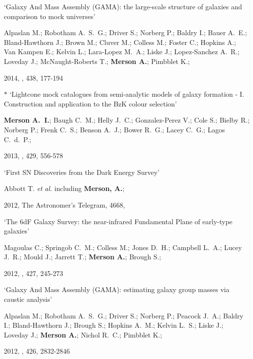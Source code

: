 \begin{etaremune}[leftmargin=15pt]
\item \label{itm:Alpaslan2014} `Galaxy And Mass Assembly (GAMA): the large-scale structure of galaxies and comparison to mock universes'\newline
  \begin{small}Alpaslan M.; Robotham A.~S.~G.; Driver S.; Norberg P.; Baldry I.; Bauer A.~E.; Bland-Hawthorn J.; Brown M.; Cluver M.; Colless M.; Foster C.; Hopkins A.; Van Kampen E.; Kelvin L.; Lara-Lopez M.~A.; Liske J.; Lopez-Sanchez A.~R.; Loveday J.; McNaught-Roberts T.; \textbf{Merson A.}; Pimbblet K.;\end{small} 2014, \mnras, 438, 177-194

\item \label{itm:Merson2013}{\Large $\ast$} `Lightcone mock catalogues from semi-analytic models of galaxy formation - I. Construction and application to the BzK colour selection'\newline
  \begin{small}\textbf{Merson A.~I.}; Baugh C.~M.; Helly J.~C.; Gonzalez-Perez V.; Cole S.; Bielby R.; Norberg P.; Frenk C.~S.; Benson A.~J.; Bower R.~G.; Lacey C.~G.; Lagos C.~d.~P.;\end{small} 2013, \mnras, 429, 556-578

\item \label{itm:Abbott2012} `First SN Discoveries from the Dark Energy Survey'\newline
  \begin{small}Abbott T. \textit{et al.} including \textbf{Merson, A.};\end{small} 2012, The Astronomer's Telegram, 4668,

\item \label{itm:Magoulas2012} `The 6dF Galaxy Survey: the near-infrared Fundamental Plane of early-type galaxies'\newline
  \begin{small}Magoulas C.; Springob C.~M.; Colless M.; Jones D.~H.; Campbell L.~A.; Lucey J.~R.; Mould J.; Jarrett T.; \textbf{Merson A.}; Brough S.;\end{small} 2012, \mnras, 427, 245-273

\item \label{itm:Alpaslan2012} `Galaxy And Mass Assembly (GAMA): estimating galaxy group masses via caustic analysis'\newline
  \begin{small}Alpaslan M.; Robotham A.~S.~G.; Driver S.; Norberg P.; Peacock J.~A.; Baldry I.; Bland-Hawthorn J.; Brough S.; Hopkins A.~M.; Kelvin L.~S.; Liske J.; Loveday J.; \textbf{Merson A.}; Nichol R.~C.; Pimbblet K.;\end{small} 2012, \mnras, 426, 2832-2846


\end{etaremune}
